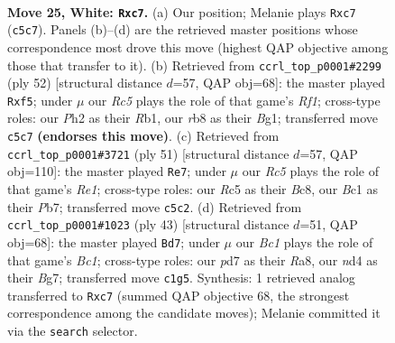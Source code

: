 \documentclass[11pt]{article}
\begin{document}
\clearpage

\begin{figure}[p]\centering
\begin{subfigure}{0.46\textwidth}\centering
\resizebox{\linewidth}{!}{%
\newchessgame
\chessboard[
  setfen={1rb2r2/p1pp1pk1/8/2R1p2p/3n4/5PP1/PP3P1P/2B1KB1R w - - 2 25},
  showmover=false,
  pgfstyle=straightmove, color=movearrow, markmove={c5-c7}
]}
\caption{}
\end{subfigure}\hfill
\begin{subfigure}{0.46\textwidth}\centering
\resizebox{\linewidth}{!}{%
\newchessgame
\chessboard[
  setfen={2r3k1/1p3p1p/5b2/P1pp1p2/1p6/3P4/1PP1r1PP/1R3RBK w - - 4 27},
  showmover=false,
  pgfstyle=straightmove, color=movearrow, markmove={f1-f5}
]}
\caption{}
\end{subfigure}
\\[4pt]
\begin{subfigure}{0.46\textwidth}\centering
\resizebox{\linewidth}{!}{%
\newchessgame
\chessboard[
  setfen={r1b1r1k1/1p5p/4P1p1/pN1p1pP1/1n6/1N1P1R2/PP5P/4R1K1 b - - 1 26},
  showmover=false,
  pgfstyle=straightmove, color=movearrow, markmove={e8-e7}
]}
\caption{}
\end{subfigure}\hfill
\begin{subfigure}{0.46\textwidth}\centering
\resizebox{\linewidth}{!}{%
\newchessgame
\chessboard[
  setfen={r1b5/p4kbp/1p2p1p1/1N2P3/2Pp4/3B4/PP4PP/4R2K b - - 3 22},
  showmover=false,
  pgfstyle=straightmove, color=movearrow, markmove={c8-d7}
]}
\caption{}
\end{subfigure}
\caption{\textbf{Move 25, White: \texttt{Rxc7}.} (a) Our position; Melanie plays \texttt{Rxc7} (\texttt{c5c7}). Panels (b)--(d) are the retrieved master positions whose correspondence most drove this move (highest QAP objective among those that transfer to it). (b) Retrieved from \texttt{ccrl\_top\_p0001\#2299} (ply 52) [structural distance $d$=57, QAP obj=68]: the master played \texttt{Rxf5}; under $\mu$ our \emph{Rc5} plays the role of that game's \emph{Rf1}; cross-type roles: our \emph{P}h2 as their \emph{R}b1, our \emph{r}b8 as their \emph{B}g1; transferred move \texttt{c5c7} \textbf{(endorses this move)}. (c) Retrieved from \texttt{ccrl\_top\_p0001\#3721} (ply 51) [structural distance $d$=57, QAP obj=110]: the master played \texttt{Re7}; under $\mu$ our \emph{Rc5} plays the role of that game's \emph{Re1}; cross-type roles: our \emph{R}c5 as their \emph{B}c8, our \emph{B}c1 as their \emph{P}b7; transferred move \texttt{c5c2}. (d) Retrieved from \texttt{ccrl\_top\_p0001\#1023} (ply 43) [structural distance $d$=51, QAP obj=68]: the master played \texttt{Bd7}; under $\mu$ our \emph{Bc1} plays the role of that game's \emph{Bc1}; cross-type roles: our \emph{p}d7 as their \emph{R}a8, our \emph{n}d4 as their \emph{B}g7; transferred move \texttt{c1g5}. Synthesis: 1 retrieved analog transferred to \texttt{Rxc7} (summed QAP objective 68, the strongest correspondence among the candidate moves); Melanie committed it via the \texttt{search} selector.}
\label{fig:thought-m48}
\end{figure}
\end{document}
